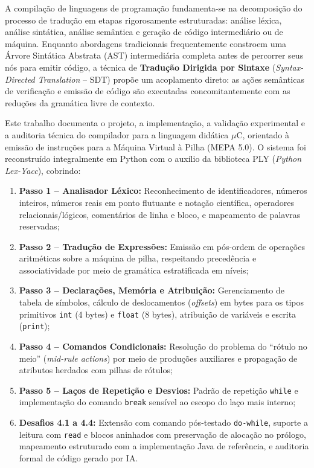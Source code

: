 \documentclass[12pt,a4paper]{article}
\begin{document}
A compilação de linguagens de programação fundamenta-se na decomposição do
processo de tradução em etapas rigorosamente estruturadas: análise léxica,
análise sintática, análise semântica e geração de código intermediário ou de
máquina. Enquanto abordagens tradicionais frequentemente constroem uma Árvore
Sintática Abstrata (AST) intermediária completa antes de percorrer seus nós
para emitir código, a técnica de \textbf{Tradução Dirigida por Sintaxe}
(\textit{Syntax-Directed Translation} -- SDT) propõe um acoplamento direto:
as ações semânticas de verificação e emissão de código são executadas
concomitantemente com as reduções da gramática livre de contexto.

Este trabalho documenta o projeto, a implementação, a validação experimental e
a auditoria técnica do compilador para a linguagem didática $\mu$C, orientado à
emissão de instruções para a Máquina Virtual à Pilha (MEPA 5.0). O sistema foi
reconstruído integralmente em Python com o auxílio da biblioteca PLY
(\textit{Python Lex-Yacc}), cobrindo:

\begin{enumerate}[label=\textbf{\arabic*.}]
    \item \textbf{Passo 1 -- Analisador Léxico:} Reconhecimento de identificadores,
          números inteiros, números reais em ponto flutuante e notação científica,
          operadores relacionais/lógicos, comentários de linha e bloco, e
          mapeamento de palavras reservadas;
    \item \textbf{Passo 2 -- Tradução de Expressões:} Emissão em pós-ordem de
          operações aritméticas sobre a máquina de pilha, respeitando precedência
          e associatividade por meio de gramática estratificada em níveis;
    \item \textbf{Passo 3 -- Declarações, Memória e Atribuição:} Gerenciamento de
          tabela de símbolos, cálculo de deslocamentos (\textit{offsets}) em bytes
          para os tipos primitivos \texttt{int} (4 bytes) e \texttt{float} (8 bytes),
          atribuição de variáveis e escrita (\texttt{print});
    \item \textbf{Passo 4 -- Comandos Condicionais:} Resolução do problema do
          ``rótulo no meio'' (\textit{mid-rule actions}) por meio de produções
          auxiliares e propagação de atributos herdados com pilhas de rótulos;
    \item \textbf{Passo 5 -- Laços de Repetição e Desvios:} Padrão de repetição
          \texttt{while} e implementação do comando \texttt{break} sensível ao
          escopo do laço mais interno;
    \item \textbf{Desafios 4.1 a 4.4:} Extensão com comando pós-testado
          \texttt{do-while}, suporte a leitura com \texttt{read} e blocos aninhados
          com preservação de alocação no prólogo, mapeamento estruturado com a
          implementação Java de referência, e auditoria formal de código gerado por IA.
\end{enumerate}
\end{document}
